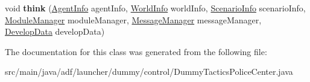 \begin{DoxyCompactItemize}
\item 
\hypertarget{classadf_1_1launcher_1_1dummy_1_1control_1_1DummyTacticsPoliceCenter_a5e22ececd97960eee50e96c20fc47038}{}\label{classadf_1_1launcher_1_1dummy_1_1control_1_1DummyTacticsPoliceCenter_a5e22ececd97960eee50e96c20fc47038} 
void {\bfseries think} (\hyperlink{classadf_1_1agent_1_1info_1_1AgentInfo}{Agent\+Info} agent\+Info, \hyperlink{classadf_1_1agent_1_1info_1_1WorldInfo}{World\+Info} world\+Info, \hyperlink{classadf_1_1agent_1_1info_1_1ScenarioInfo}{Scenario\+Info} scenario\+Info, \hyperlink{classadf_1_1agent_1_1module_1_1ModuleManager}{Module\+Manager} module\+Manager, \hyperlink{classadf_1_1agent_1_1communication_1_1MessageManager}{Message\+Manager} message\+Manager, \hyperlink{classadf_1_1agent_1_1develop_1_1DevelopData}{Develop\+Data} develop\+Data)
\end{DoxyCompactItemize}


The documentation for this class was generated from the following file\+:\begin{DoxyCompactItemize}
\item 
src/main/java/adf/launcher/dummy/control/Dummy\+Tactics\+Police\+Center.\+java\end{DoxyCompactItemize}

